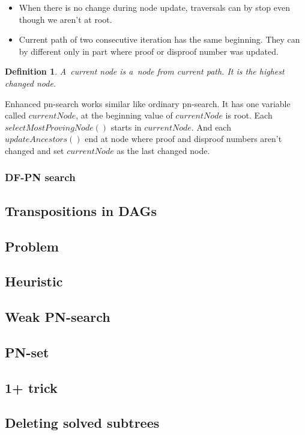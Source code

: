 \begin{itemize}
\item When there is no change during node update, traversals can by stop even though we
aren't at root.
\item Current path of two consecutive iteration has the same beginning. They can by different 
only in part where proof or disproof number was updated.
\end{itemize}

\newtheorem*{currentNode}{Definition}	
\begin{currentNode}
A~{\sl current node} is a~node from current path. It is the highest changed node.
\end{currentNode}


Enhanced pn-search works similar like ordinary pn-search. It has one variable
called $currentNode$, at the beginning value of $currentNode$ is root. Each
$selectMostProvingNode()$ starts in $currentNode$. And each $updateAncestors()$
end at node where proof and disproof numbers aren't changed and set
$currentNode$ as the last changed node.

\subsubsection{DF-PN search}


\subsection{Transpositions in DAGs}


\subsection{Problem  }

\subsection{Heuristic}

\subsection{Weak PN-search}

\subsection{PN-set}

\subsection{1+ trick}


\subsection{Deleting solved subtrees}


